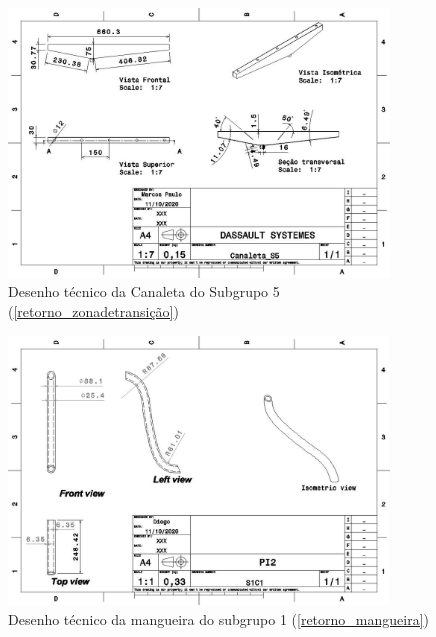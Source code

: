 \begin{apendicesenv}
\begin{figure}[H]
    \centering
    \includegraphics[width=0.9\textwidth]{figuras/estrutura/Desenhos/Canaleta_S5.jpg}
    \caption{Desenho técnico da Canaleta do Subgrupo 5 (\ref{retorno_zonadetransição})}
    \label{fig:canaletaS5}
\end{figure}

\begin{figure}[H]
    \centering
    \includegraphics[width=0.9\textwidth]{figuras/estrutura/Desenhos/Drawing1_S1C1.jpg}
    \caption{Desenho técnico da mangueira do subgrupo 1 (\ref{retorno_mangueira})}
    \label{fig:M_S1}
\end{figure}


\end{apendicesenv}
